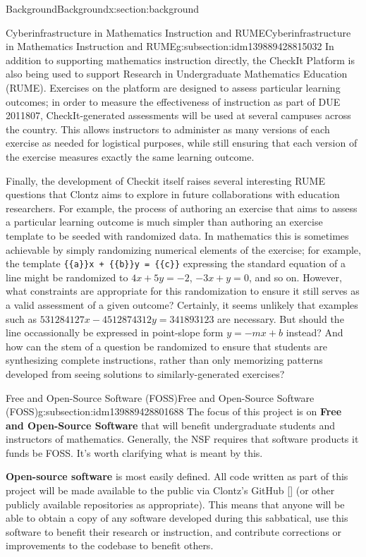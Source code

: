 \documentclass[oneside,10pt,]{article}
\newcommand{\xreffont}{\relax}
\newcommand{\mono}[1]{\texttt{#1}}
\newcommand{\terminology}[1]{\textbf{#1}}
\begin{document}
\begin{sectionptx}{Background}{}{Background}{}{}{x:section:background}
\begin{subsectionptx}{Cyberinfrastructure in Mathematics Instruction and RUME}{}{Cyberinfrastructure in Mathematics Instruction and RUME}{}{}{g:subsection:idm139889428815032}
In addition to supporting mathematics instruction directly, the CheckIt Platform is also being used to support Research in Undergraduate Mathematics Education (RUME). Exercises on the platform are designed to assess particular learning outcomes; in order to measure the effectiveness of instruction as part of DUE 2011807, CheckIt-generated assessments will be used at several campuses across the country. This allows instructors to administer as many versions of each exercise as needed for logistical purposes, while still ensuring that each version of the exercise measures exactly the same learning outcome.%
\par
Finally, the development of Checkit itself raises several interesting RUME questions that Clontz aims to explore in future collaborations with education researchers. For example, the process of authoring an exercise that aims to assess a particular learning outcome is much simpler than authoring an exercise template to be seeded with randomized data. In mathematics this is sometimes achievable by simply randomizing numerical elements of the exercise; for example, the template \mono{\{\{a\}\}x + \{\{b\}\}y = \{\{c\}\}} expressing the standard equation of a line might be randomized to \(4x+5y=-2\), \(-3x+y=0\), and so on. However, what constraints are appropriate for this randomization to ensure it still serves as a valid assessment of a given outcome? Certainly, it seems unlikely that examples such as \(531284127x-4512874312y=341893123\) are necessary. But should the line occassionally be expressed in point-slope form \(y=-mx+b\) instead? And how can the stem of a question be randomized to ensure that students are synthesizing complete instructions, rather than only memorizing patterns developed from seeing solutions to similarly-generated exercises?%
\end{subsectionptx}
%
%
\typeout{************************************************}
\typeout{************************************************}
%
\begin{subsectionptx}{Free and Open-Source Software (FOSS)}{}{Free and Open-Source Software (FOSS)}{}{}{g:subsection:idm139889428801688}
The focus of this project is on \terminology{Free and Open-Source Software} that will benefit undergraduate students and instructors of mathematics. Generally, the NSF requires that software products it funds be FOSS. It's worth clarifying what is meant by this.%
\par
\terminology{Open-source software} is most easily defined. All code written as part of this project will be made available to the public via Clontz's GitHub \hyperlink{x:biblio:biblio-ghclontz}{[{\xreffont 9}]} (or other publicly available repositories as appropriate). This means that anyone will be able to obtain a copy of any software developed during this sabbatical, use this software to benefit their research or instruction, and contribute corrections or improvements to the codebase to benefit others.%

\end{subsectionptx}
\end{sectionptx}
\end{document}
